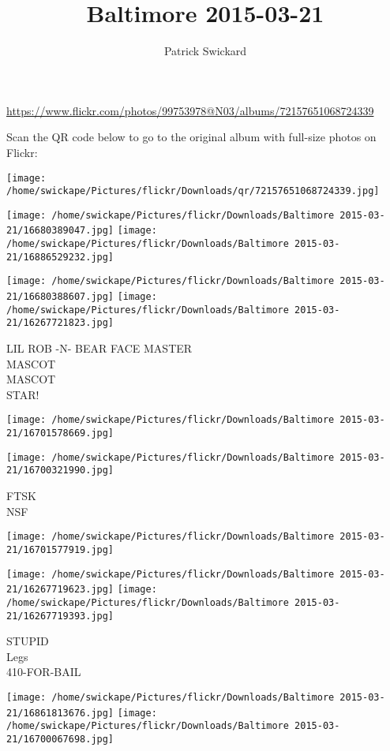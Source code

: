 \documentclass[10pt,letterpaper]{article}
\title{Baltimore 2015-03-21}
\author{Patrick Swickard}
\date{}
\begin{document}
\maketitle

\url{https://www.flickr.com/photos/99753978@N03/albums/72157651068724339}

Scan the QR code below to go to the original album with full-size photos on Flickr:

\texttt{[image: /home/swickape/Pictures/flickr/Downloads/qr/72157651068724339.jpg]}
\pagebreak

\texttt{[image: /home/swickape/Pictures/flickr/Downloads/Baltimore 2015-03-21/16680389047.jpg]}
\texttt{[image: /home/swickape/Pictures/flickr/Downloads/Baltimore 2015-03-21/16886529232.jpg]}

\texttt{[image: /home/swickape/Pictures/flickr/Downloads/Baltimore 2015-03-21/16680388607.jpg]}
\texttt{[image: /home/swickape/Pictures/flickr/Downloads/Baltimore 2015-03-21/16267721823.jpg]}

LIL ROB {-}N{-} BEAR FACE MASTER\\
MASCOT\\
MASCOT\\
STAR!
\pagebreak

\texttt{[image: /home/swickape/Pictures/flickr/Downloads/Baltimore 2015-03-21/16701578669.jpg]}

\vspace{0.25in}
\texttt{[image: /home/swickape/Pictures/flickr/Downloads/Baltimore 2015-03-21/16700321990.jpg]}

FTSK\\
NSF
\pagebreak

\texttt{[image: /home/swickape/Pictures/flickr/Downloads/Baltimore 2015-03-21/16701577919.jpg]}

\vspace{0.25in}
\texttt{[image: /home/swickape/Pictures/flickr/Downloads/Baltimore 2015-03-21/16267719623.jpg]}
\texttt{[image: /home/swickape/Pictures/flickr/Downloads/Baltimore 2015-03-21/16267719393.jpg]}

STUPID\\
Legs\\
410{-}FOR{-}BAIL
\pagebreak

\texttt{[image: /home/swickape/Pictures/flickr/Downloads/Baltimore 2015-03-21/16861813676.jpg]}
\texttt{[image: /home/swickape/Pictures/flickr/Downloads/Baltimore 2015-03-21/16700067698.jpg]}
\end{document}
